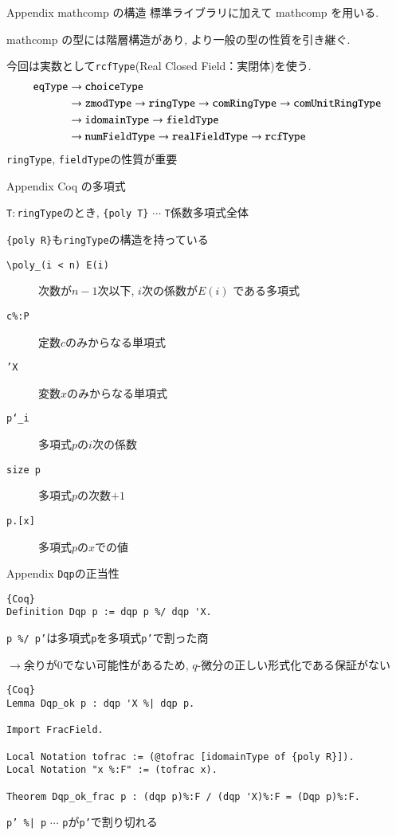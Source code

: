 \documentclass[dvipdfmx,cjk]{beamer}
\theoremstyle{mystyle}
\newcommand{\0}{\textbf{0}}
\begin{document}
\begin{frame}{Appendix mathcomp の構造}
	標準ライブラリ\cite{coq sl}に加えて mathcomp \cite{coq mc}を用いる. \pause
	
	mathcomp の型には階層構造があり, より一般の型の性質を引き継ぐ. \pause
	
	今回は実数として{\tt rcfType}(Real Closed Field：実閉体)を使う. \pause
	\begin{align*}
		{\tt eqType} &\to {\tt choiceType} \\
		                  &\to {\tt zmodType} \to {\tt ringType} \to 
		                          {\tt comRingType} \to {\tt comUnitRingType}\\
							  &\to {\tt idomainType} \to {\tt fieldType}\\
		                  &\to {\tt numFieldType} \to {\tt realFieldType} \to {\tt rcfType}
	\end{align*} \pause
	{\tt ringType}, {\tt fieldType}の性質が重要
\end{frame}

\begin{frame}{Appendix Coq の多項式}

	{\tt T}$\colon${\tt ringType}のとき, {\tt \{poly T\}} $\cdots$ {\tt T}係数多項式全体 
	
	{\tt \{poly R\}}も{\tt ringType}の構造を持っている
	\begin{description}
	  \item[\tt \textbackslash poly\_(i < n) E(i)] 次数が$n - 1$次以下, $i$次の係数が$E(i)$
	    である多項式
	  \item[\tt c\%:P] 定数$c$のみからなる単項式
	  \item[\tt 'X] 変数$x$のみからなる単項式
	  \item[\tt p`\_i] 多項式$p$の$i$次の係数 
	  \item[\tt size p] 多項式$p$の次数$+1$
	  \item[{\tt p.[x]}] 多項式$p$の$x$での値 
	\end{description}
\end{frame}

\begin{frame}[fragile]{Appendix {\tt Dqp}の正当性}
	\begin{lstlisting}{Coq}
Definition Dqp p := dqp p %/ dqp 'X.
\end{lstlisting}
	{\tt p \%/ p'}は多項式{\tt p}を多項式{\tt p'}で割った商
	
	$\to$余りが$0$でない可能性があるため, $q$-微分の正しい形式化である保証がない
	\begin{lstlisting}{Coq}
Lemma Dqp_ok p : dqp 'X %| dqp p.

Import FracField.

Local Notation tofrac := (@tofrac [idomainType of {poly R}]).
Local Notation "x %:F" := (tofrac x).

Theorem Dqp_ok_frac p : (dqp p)%:F / (dqp 'X)%:F = (Dqp p)%:F.
\end{lstlisting}
	{\tt p' \%| p} $\cdots$ {\tt p}が{\tt p'}で割り切れる
\end{frame}
\end{document}
